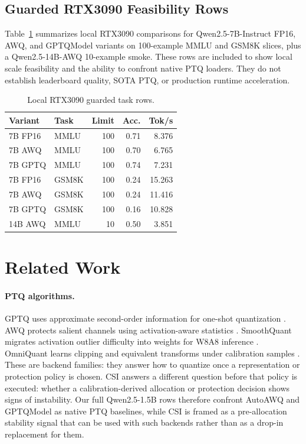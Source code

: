 \documentclass[letterpaper]{article}
\begin{document}
\subsection{Guarded RTX3090 Feasibility Rows}

Table~\ref{tab:rtx3090} summarizes local RTX3090 comparisons for
Qwen2.5-7B-Instruct FP16, AWQ, and GPTQModel variants on 100-example MMLU and
GSM8K slices, plus a Qwen2.5-14B-AWQ 10-example smoke. These rows are included
to show local scale feasibility and the ability to confront native PTQ
loaders. They do not establish leaderboard quality, SOTA PTQ, or production
runtime acceleration.

\begin{table}[t]
\centering
\small
\caption{Local RTX3090 guarded task rows.}
\label{tab:rtx3090}
\begin{tabular}{llrrr}
\toprule
Variant & Task & Limit & Acc. & Tok/s \\
\midrule
7B FP16 & MMLU & 100 & 0.71 & 8.376 \\
7B AWQ & MMLU & 100 & 0.70 & 6.765 \\
7B GPTQ & MMLU & 100 & 0.74 & 7.231 \\
7B FP16 & GSM8K & 100 & 0.24 & 15.263 \\
7B AWQ & GSM8K & 100 & 0.24 & 11.416 \\
7B GPTQ & GSM8K & 100 & 0.16 & 10.828 \\
14B AWQ & MMLU & 10 & 0.50 & 3.851 \\
\bottomrule
\end{tabular}
\end{table}

\section{Related Work}

\paragraph{PTQ algorithms.}
GPTQ uses approximate second-order information for one-shot quantization
\citep{frantar2023gptq}. AWQ protects salient channels using activation-aware
statistics \citep{lin2024awq}. SmoothQuant migrates activation outlier
difficulty into weights for W8A8 inference \citep{xiao2023smoothquant}.
OmniQuant learns clipping and equivalent transforms under calibration samples
\citep{shao2024omniquant}. These are backend families: they answer how to
quantize once a representation or protection policy is chosen. CSI answers a
different question before that policy is executed: whether a
calibration-derived allocation or protection decision shows signs of
instability. Our full Qwen2.5-1.5B rows therefore confront AutoAWQ and GPTQModel
as native PTQ baselines, while CSI is framed as a pre-allocation stability
signal that can be used with such backends rather than as a drop-in replacement
for them.
\end{document}

